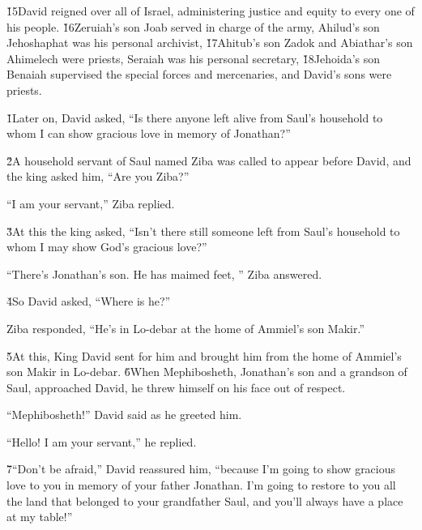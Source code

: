 \v{15}David reigned over all of Israel, administering justice and equity to every one of his people. \v{16}Zeruiah's son Joab served in charge of the army, Ahilud's son Jehoshaphat was his personal archivist, \v{17}Ahitub's son Zadok and Abiathar's son Ahimelech were priests, Seraiah was his personal secretary, \v{18}Jehoida's son Benaiah supervised the special forces and mercenaries, and David's sons were priests.

\v{1}Later on, David asked, ``Is there anyone left alive from Saul's household to whom I can show gracious love in memory of Jonathan?''

\v{2}A household servant of Saul named Ziba was called to appear before David, and the king asked him, ``Are you Ziba?''

``I am your servant,'' Ziba replied.

\v{3}At this the king asked, ``Isn't there still someone left from Saul's household to whom I may show God's gracious love?''

``There's Jonathan's son. He has maimed feet, '' Ziba answered.

\v{4}So David asked, ``Where is he?''

Ziba responded, ``He's in Lo-debar at the home of Ammiel's son Makir.''

\v{5}At this, King David sent for him and brought him from the home of Ammiel's son Makir in Lo-debar. \v{6}When Mephibosheth, Jonathan's son and a grandson of Saul, approached David, he threw himself on his face out of respect.

``Mephibosheth!'' David said as he greeted him.

``Hello! I am your servant,'' he replied.

\v{7}``Don't be afraid,'' David reassured him, ``because I'm going to show gracious love to you in memory of your father Jonathan. I'm going to restore to you all the land that belonged to your grandfather Saul, and you'll always have a place at my table!''

